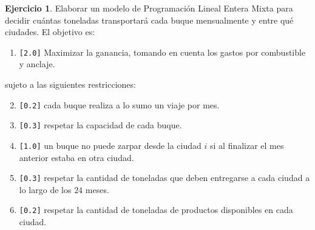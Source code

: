 \documentclass[a4paper,oneside,12pt]{amsart}
\theoremstyle{definition}
\newtheorem{quest}{Ejercicio}
\begin{document}
\begin{quest}
Elaborar un modelo de Programación Lineal Entera Mixta para decidir cuántas toneladas transportará cada buque mensualmente y entre qué ciudades. El objetivo es:
\begin{enumerate}
    \item \verb|[2.0]| Maximizar la ganancia, tomando en cuenta los gastos por combustible y  anclaje. 
\end{enumerate}
sujeto a las siguientes restricciones:
\begin{enumerate}
    \setcounter{enumi}{1}
    \item \verb|[0.2]| cada buque realiza a lo sumo un viaje por mes.
    \item \verb|[0.3]| respetar la capacidad de cada buque.
    \item \verb|[1.0]| un buque no puede zarpar desde la ciudad $i$ si al finalizar el mes anterior estaba en otra ciudad.
    \item \verb|[0.3]| respetar la cantidad de toneladas que deben entregarse a cada ciudad a lo largo de los $24$ meses.
    \item \verb|[0.2]| respetar la cantidad de toneladas de productos disponibles en cada ciudad.
\end{enumerate}

\end{quest}


\end{document}
